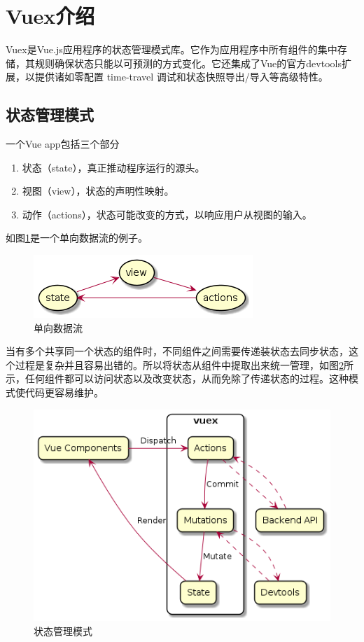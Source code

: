 \section{Vuex介绍}

Vuex是Vue.js应用程序的状态管理模式库。它作为应用程序中所有组件的集中存储，其规则确保状态只能以可预测的方式变化。它还集成了Vue的官方devtools扩展，以提供诸如零配置 time-travel 调试和状态快照导出/导入等高级特性。

\subsection{状态管理模式}

一个Vue app包括三个部分
\begin{enumerate}[label=\circled{\arabic*}]
  \item 状态（state），真正推动程序运行的源头。
  \item 视图（view），状态的声明性映射。
  \item 动作（actions），状态可能改变的方式，以响应用户从视图的输入。
\end{enumerate}

如图\ref{vuex-one-way-data-flow}是一个单向数据流的例子。

\begin{figure}[htbp]
  \centering
  \includegraphics[scale = 0.6]{out/uml/部署图/vuex-one-way-data-flow/vuex-one-way-data-flow.png}
  \caption{\song\wuhao 单向数据流}
  \label{vuex-one-way-data-flow}
\end{figure}

当有多个共享同一个状态的组件时，不同组件之间需要传递装状态去同步状态，这个过程是复杂并且容易出错的。所以将状态从组件中提取出来统一管理，如图\ref{vuex-state-management-pattern}所示，任何组件都可以访问状态以及改变状态，从而免除了传递状态的过程。这种模式使代码更容易维护。

\begin{figure}[htbp]
  \centering
  \includegraphics[scale = 0.5]{out/uml/部署图/vuex-state-management-pattern/vuex-state-management-pattern.png}
  \caption{\song\wuhao 状态管理模式}
  \label{vuex-state-management-pattern}
\end{figure}

